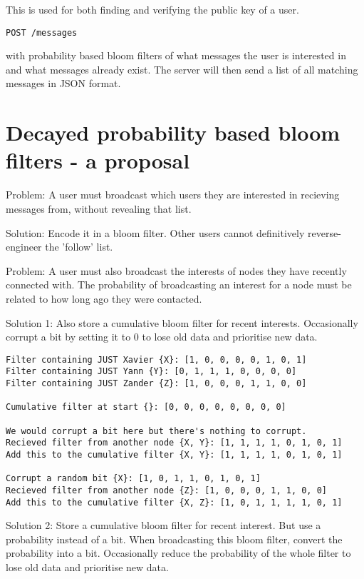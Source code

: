 \documentclass{article}
\begin{document}
This is used for both finding and verifying the public key of a user.

\begin{verbatim}
POST /messages
\end{verbatim}
with probability based bloom filters of what messages the user is interested in and what messages already exist. The server will then send a list of all matching messages in JSON format.

\section*{Decayed probability based bloom filters - a proposal}

Problem:
A user must broadcast which users they are interested in recieving messages from, without revealing that list.

Solution:
Encode it in a bloom filter. Other users cannot definitively reverse-engineer the 'follow' list.

Problem:
A user must also broadcast the interests of nodes they have recently connected with. The probability of broadcasting an interest for a node must be related to how long ago they were contacted.

Solution 1:
Also store a cumulative bloom filter for recent interests. Occasionally corrupt a bit by setting it to 0 to lose old data and prioritise new data.

\begin{verbatim}
Filter containing JUST Xavier {X}: [1, 0, 0, 0, 0, 1, 0, 1]
Filter containing JUST Yann {Y}: [0, 1, 1, 1, 0, 0, 0, 0]
Filter containing JUST Zander {Z}: [1, 0, 0, 0, 1, 1, 0, 0]

Cumulative filter at start {}: [0, 0, 0, 0, 0, 0, 0, 0]

We would corrupt a bit here but there's nothing to corrupt.
Recieved filter from another node {X, Y}: [1, 1, 1, 1, 0, 1, 0, 1]
Add this to the cumulative filter {X, Y}: [1, 1, 1, 1, 0, 1, 0, 1]

Corrupt a random bit {X}: [1, 0, 1, 1, 0, 1, 0, 1]
Recieved filter from another node {Z}: [1, 0, 0, 0, 1, 1, 0, 0]
Add this to the cumulative filter {X, Z}: [1, 0, 1, 1, 1, 1, 0, 1]
\end{verbatim}

Solution 2:
Store a cumulative bloom filter for recent interest. But use a probability instead of a bit. When broadcasting this bloom filter, convert the probability into a bit. Occasionally reduce the probability of the whole filter to lose old data and prioritise new data.
\end{document}
